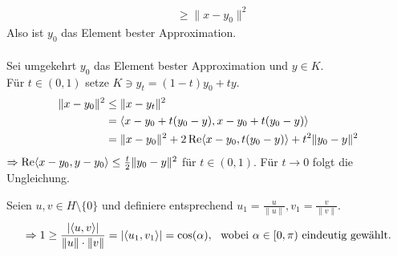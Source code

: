 \begin{beweis}
\begin{enumerate}[label=\alph*\upshape)]
\begin{align*}
								& \geq \| x - y_{0} \|^{2}
			\end{align*}
			Also ist $y_{0}$ das Element bester Approximation. \\ \\
			Sei umgekehrt $y_{0}$ das Element bester Approximation und $y \in K$. \\
			Für $t \in (0, 1)$ setze $ K \ni y_{t} = ( 1 - t ) y_{0} + t y$.
			\begin{align*}
				\| x - y_{0} \|^{2} & \leq \| x - y_{t} \|^{2} \\
									& = \langle x - y_{0} + t ( y_{0} - y ), x - y_{0} + t ( y_{0}  - y ) \rangle \\
									& = \| x - y_{0} \|^{2} + 2 \mathop{\rm Re}\nolimits \langle  x - y_{0}, t ( y_{0} - y ) \rangle + t^{2} \| y_{0} - y \|^{2}
			\end{align*}
			$\Rightarrow \mathop{\rm Re}\nolimits \langle x - y_{0}, y - y_{0} \rangle \leq \frac{t}{2} \| y_{0} - y \|^{2}$ für $t \in (0, 1)$. Für $t \rightarrow 0$ folgt die Ungleichung.
	\end{enumerate}
\end{beweis}


\begin{bemerkung}
		Seien $u, v \in H \setminus \{ 0 \}$ und definiere entsprechend $u_{1} = \frac{u}{\| u \|}, v_{1} = \frac{v}{\| v \|}$.
		\[ \Rightarrow 1 \geq \frac{|\< u, v \>|}{\|u \| \cdot \| v \|} = | \< u_{1}, v_{1} \> | = \cos(\alpha), \text{ wobei } \alpha \in [0, \pi) \text{ eindeutig gewählt.} \]
\end{bemerkung}



\newpage